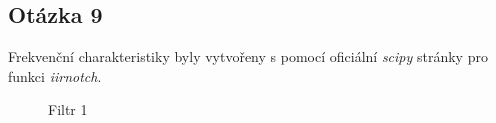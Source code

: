 \documentclass[a4paper,12pt]{article}
\begin{document}
\subsection{Otázka 9}
Frekvenční charakteristiky byly vytvořeny s pomocí oficiální \emph{scipy} stránky pro funkci \emph{iirnotch}.
\begin{figure}[h!]
\centering
\begin{minipage}{0.48\textwidth}
\end{minipage}
\hfill 
\begin{minipage}{0.48\textwidth}
\end{minipage}
\caption{Filtr 1}
\end{figure}
\end{document}
